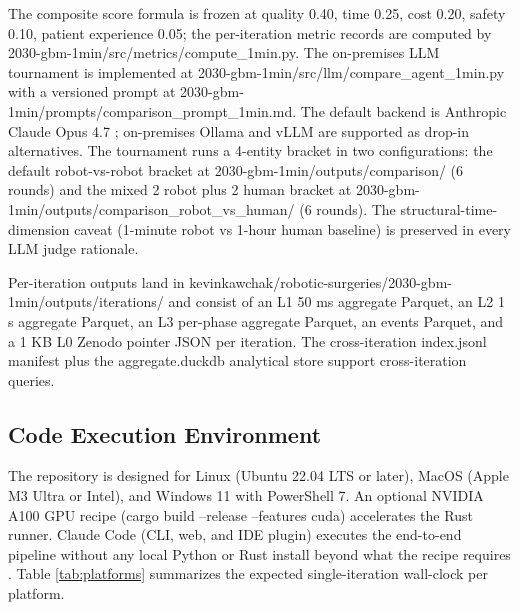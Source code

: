 The composite score formula is frozen at quality 0.40, time 0.25,
cost 0.20, safety 0.10, patient experience 0.05; the per-iteration
metric records are computed by
2030-gbm-1min/src/metrics/compute_1min.py. The on-premises LLM
tournament is implemented at 2030-gbm-1min/src/llm/compare_agent_1min.py
with a versioned prompt at 2030-gbm-1min/prompts/comparison_prompt_1min.md.
The default backend is Anthropic Claude Opus 4.7
\cite{claude-opus-47, claude-code}; on-premises Ollama \cite{ollama}
and vLLM \cite{vllm} are supported as drop-in alternatives. The
tournament runs a 4-entity bracket in two configurations: the default
robot-vs-robot bracket at 2030-gbm-1min/outputs/comparison/ (6
rounds) and the mixed 2 robot plus 2 human bracket at
2030-gbm-1min/outputs/comparison_robot_vs_human/ (6 rounds). The
structural-time-dimension caveat (1-minute robot vs 1-hour human
baseline) is preserved in every LLM judge rationale.

Per-iteration outputs land in
kevinkawchak/robotic-surgeries/2030-gbm-1min/outputs/iterations/ and
consist of an L1 50 ms aggregate Parquet, an L2 1 s aggregate
Parquet, an L3 per-phase aggregate Parquet, an events Parquet, and
a 1 KB L0 Zenodo pointer JSON per iteration. The cross-iteration
index.jsonl manifest plus the aggregate.duckdb analytical store
\cite{duckdb} support cross-iteration queries.

\subsection{Code Execution Environment}
\label{sec:methods-execution}

The repository is designed for Linux (Ubuntu 22.04 LTS or later),
MacOS (Apple M3 Ultra or Intel), and Windows 11 with
PowerShell 7. An optional NVIDIA A100 GPU recipe (cargo build
--release --features cuda) accelerates the Rust runner. Claude
Code (CLI, web, and IDE plugin) executes the end-to-end pipeline
without any local Python or Rust install beyond what the recipe
requires \cite{claude-code, claude-opus-47}. Table \ref{tab:platforms}
summarizes the expected single-iteration wall-clock per platform.

\clearpage

